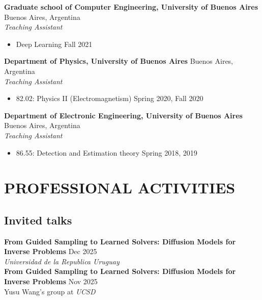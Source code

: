 \documentclass[a4paper,9pt]{extarticle}
\begin{document}
\noindent
\textbf{Graduate school of Computer Engineering, University of Buenos Aires} \hfill Buenos Aires, Argentina\\ %
\textit{Teaching Assistant} %
\begin{itemize}
    \item Deep Learning \hfill Fall 2021
\end{itemize}

\noindent
\textbf{Department of Physics, University of Buenos Aires} \hfill Buenos Aires, Argentina\\ %
\textit{Teaching Assistant} %
\begin{itemize}
    \item 82.02: Physics II (Electromagnetism) \hfill Spring 2020, Fall 2020
\end{itemize}

\noindent
\textbf{Department of Electronic Engineering, University of Buenos Aires} \hfill Buenos Aires, Argentina\\ %
\textit{Teaching Assistant} %
\begin{itemize}
    \item 86.55: Detection and Estimation theory \hfill Spring 2018, 2019
\end{itemize}


\section*{PROFESSIONAL ACTIVITIES}
\subsection*{Invited talks}

\noindent \textbf{From Guided Sampling to Learned Solvers: Diffusion Models for Inverse Problems} \hfill  Dec 2025\\
\textit{Universidad de la Republica Uruguay} 
\\

\noindent \textbf{From Guided Sampling to Learned Solvers: Diffusion Models for Inverse Problems} \hfill  Nov 2025\\
Yusu Wang's group at \textit{UCSD} 
\\ 
\end{document}
